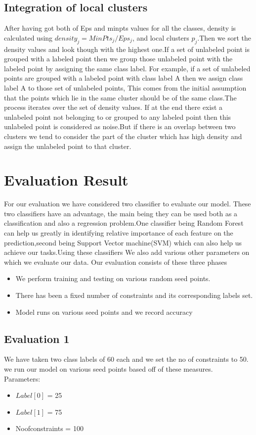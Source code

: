 \documentclass[10pt, conference, compsocconf]{IEEEtran}
\begin{document}
\subsection{Integration of local clusters}
After having got both of Eps and minpts values for all the classes, density is calculated using ${density_j = MinPts_j / Eps_j}$, and local clusters $p_j$.Then we sort the density values and look though with the highest one.If a set of unlabeled point is grouped with a labeled point then we group those unlabeled point with the labeled point by assigning the same class label. For example, if a set of unlabeled points are grouped with a labeled point with class label A then we assign class label A to those set of unlabeled points, This comes from the initial assumption that the points which lie in the same cluster should be of the same class.The process iterates over the set of density values. If at the end there exist a unlabeled point not belonging to or grouped to any labeled point then this unlabeled point is considered as noise.But if there is an overlap between two clusters we tend to consider the part of the cluster which has high density and assign the unlabeled point to that cluster.



\section{Evaluation Result}
For our evaluation we have considered two classifier to evaluate our model. These two classifiers have an advantage, the main being they can be used both as a classification and also a regression problem.One classifier being Random Forest can help us greatly in identifying relative importance of each feature on the prediction,second being Support Vector machine(SVM) which can also help us achieve our tasks.Using these classifiers We also add various other parameters on which we evaluate our data.
Our evaluation consists of these three phases
\begin{itemize}
\item We perform training and testing on various 
random seed points.
\item There has been a fixed number of constraints and 
its corresponding labels set.
\item Model runs on various seed points and we record
accuracy 
\end{itemize}

\subsection{Evaluation 1}
We have taken two class labels of 60 each and we set the no of constraints to 50.
we run our model on various seed points based off of these measures.\\
Parameters:
\begin{itemize}
\item $Label[0]$ = 25
\item $Label[1]$ = 75
\item Noofconstraints = 100
\end{itemize}
\end{document}
